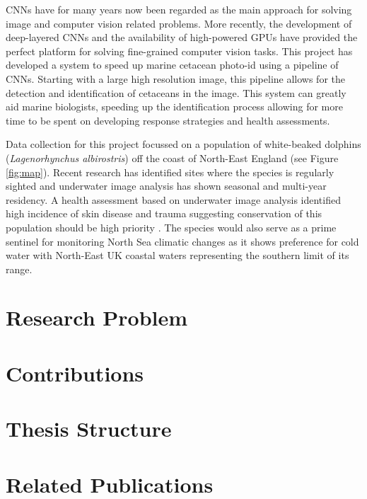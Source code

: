 CNNs have for many years now been regarded as the main approach for solving image and computer vision related problems. More recently, the development of deep-layered CNNs and the availability of  high-powered GPUs have provided the perfect platform for solving fine-grained computer vision tasks. This project has developed a system to speed up marine cetacean photo-id using a pipeline of CNNs. Starting with a large high resolution image, this pipeline allows for the detection and identification of cetaceans in the image. This system can greatly aid marine biologists, speeding up the identification process allowing for more time to be spent on developing response strategies and health assessments. 

Data collection for this project focussed on a population of white-beaked dolphins (\textit{Lagenorhynchus albirostris}) off the coast of North-East England (see Figure \ref{fig:map}). Recent research has identified sites where the species is regularly sighted \cite{galatius_lagenorhynchus_2016, hammond_cetacean_2013} and underwater image analysis has shown seasonal and multi-year residency. A health assessment based on underwater image analysis identified high incidence of skin disease and trauma suggesting conservation of this population should be high priority \cite{van_bressem_visual_2018}. The species would also serve as a prime sentinel for monitoring North Sea climatic changes as it shows preference for cold water with North-East UK coastal waters representing the southern limit of its range.

\section{Research Problem}

\section{Contributions}

\section{Thesis Structure}

\section{Related Publications}



